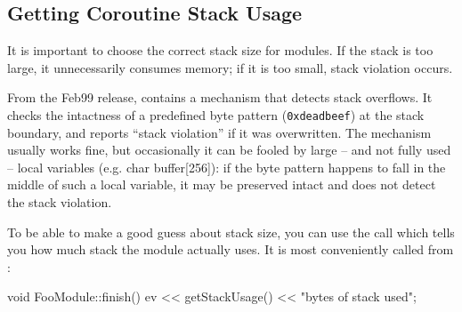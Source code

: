 %
%
%
%





\subsection{Getting Coroutine Stack Usage}

It is important to choose the correct stack size for
modules.  If the stack is
too large, it unnecessarily consumes memory; if it is too small, stack
violation occurs.

From the Feb99 release, {\opp} contains a mechanism that detects stack
overflows. It checks the intactness of a
predefined byte pattern (\texttt{0xdeadbeef}) at the stack boundary,
and reports ``stack violation'' if it was
overwritten. The mechanism usually works fine, but occasionally it can
be fooled by large -- and not fully used -- local variables (e.g. char
buffer[256]): if the byte pattern happens to fall in the middle of
such a local variable, it may be preserved intact and {\opp} does not
detect the stack violation.

To be able to make a good guess about stack size, you can use
the  call which tells you how much stack the module
actually uses. It is most conveniently called from :

\begin{cpp}
void FooModule::finish()
{
  ev << getStackUsage() <<  "bytes of stack used\n";
}
\end{cpp}


